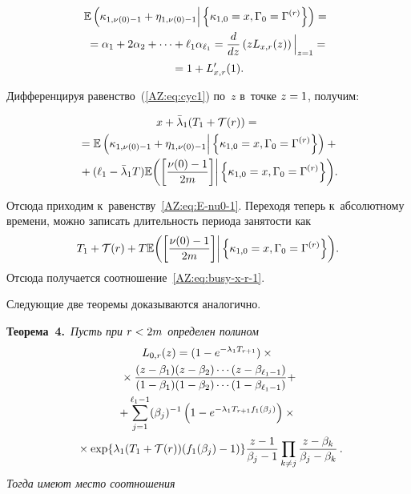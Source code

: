 \begin{multicols}{2}
\vspace*{-6pt}

\noindent
\begin{multline*}
   \! \mathbb{E} \left( \kappa_{1,\nu(0)-1}+\eta_{1,\nu(0)-1} \Big\vert
    \left\{\kappa_{1,0}=x,\Gamma_{0}=\Gamma^{(r)}\right\}\right)={}    \\ 
    {}=
    \alpha_1+2\alpha_2+\cdots+\ell_1 \alpha_{\ell_1} =
    \displaystyle\frac{\displaystyle d\mathstrut}{\displaystyle dz\mathstrut}\left(z L_{x,r}(z)\right)\Big|_{z=1} ={}\\
    {}= 1+L'_{x,r}(1).
\end{multline*}

\vspace*{-4pt}


Дифференцируя равенство~(\ref{AZ:eq:cyc1}) по~$z$ в~точке $z\hm=1$, получим:

\vspace*{-6pt}

\noindent
\begin{multline*}
  x+\bar\lambda_{1}(T_{1}+\mathcal T(r))={}\\
  {}=
  \mathbb E\left( \kappa_{1,\nu(0)-1}+\eta_{1,\nu(0)-1} \Big\vert 
 \left\{ \kappa_{1,0}=x,\Gamma_{0}=\Gamma^{(r)}\right\}\right)+{}\hspace*{-0.5pt}  \\ 
  {} +
  (\ell_1-\bar\lambda_{1}T)  \mathbb{E}\biggl(\biggl[\displaystyle\frac{\displaystyle \nu(0)-1\mathstrut}{\displaystyle 2m\mathstrut}\biggr]
  \bigg| \left\{\kappa_{1,0}=x,\Gamma_{0}=\Gamma^{(r)}\right\}\biggr).\hspace*{-0.5pt}
\end{multline*}

\vspace*{-4pt}

\noindent
Отсюда приходим к~равенству~\eqref{AZ:eq:E-nu0-1}.  Переходя теперь к~абсолютному времени, можно записать длительность периода занятости как
$$
  T_{1}+\mathcal T(r)+
  T\mathbb{E}\biggl(\biggl[\displaystyle\frac{\displaystyle \nu(0)-1\mathstrut}{\displaystyle 2m\mathstrut}\biggr]
  \bigg| \left\{\kappa_{1,0}=x,\Gamma_{0}=\Gamma^{(r)}\right\}\biggr).
$$
Отсюда получается соотношение~\eqref{AZ:eq:busy-x-r-1}.




Следующие две теоремы доказываются аналогично.

\noindent
\textbf{Теорема~4.}\
\textit{Пусть при $r\hm<2m$ определен полином}
    \begin{multline*}
      L_{0,r}(z)=(1-e^{-\lambda_1 T_{r+1}})\times{}\\
      {}\times
      \fr{(z-\beta_{1})(z-\beta_2)\cdots(z-\beta_{\ell_1-1})}%
    {(1-\beta_{1})(1-\beta_2)\cdots(1-\beta_{\ell_1-1})}+\\
    +\sum\limits_{j=1}^{\ell_1-1}(\beta_{j})^{-1}
    \left(1-e^{-\lambda_1 T_{r+1}f_1(\beta_j)}\right)\times{}\\
    {}\times
    \exp\{\lambda_{1}(T_{1}+\mathcal T(r))(f_{1}(\beta_{j})-1)\}
    \fr{z-1}{\beta_{j}-1}\prod\limits_{k\neq j}\fr{z-\beta_{k}}{\beta_{j}-\beta_{k}}\,.\hspace*{-2.84pt}
\end{multline*}
\textit{Тогда имеют место соотношения}


\end{multicols}
